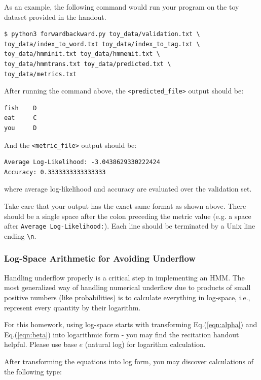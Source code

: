 \documentclass[11pt,addpoints,answers]{exam}
\begin{document}
As an example, the following command would run your program on the toy dataset provided in the handout.
\begin{lstlisting}
$ python3 forwardbackward.py toy_data/validation.txt \ 
toy_data/index_to_word.txt toy_data/index_to_tag.txt \
toy_data/hmminit.txt toy_data/hmmemit.txt \
toy_data/hmmtrans.txt toy_data/predicted.txt \ 
toy_data/metrics.txt
\end{lstlisting}

After running the command above, the \texttt{<predicted\_file>} output should be:

\begin{lstlisting}
fish    D 
eat     C
you     D

\end{lstlisting}

\clearpage
And the \texttt{<metric\_file>} output should be:

\begin{lstlisting}
Average Log-Likelihood: -3.0438629330222424
Accuracy: 0.3333333333333333
\end{lstlisting}

where average log-likelihood and accuracy are evaluated over the validation set.

Take care that your output has the exact same format as shown above. There should be a single space after the colon preceding the metric value (e.g. a space after \lstinline{Average Log-Likelihood:}). Each line should be terminated by a Unix line ending \lstinline{\n}.

\subsubsection{Log-Space Arithmetic for Avoiding Underflow}
\label{sec:underflow}

Handling underflow properly is a critical step in implementing an HMM. The most generalized way of handling numerical underflow due to products of small positive numbers (like probabilities) is to calculate everything in log-space, i.e., represent every quantity by their logarithm. 

For this homework, using log-space starts with transforming Eq.(\ref{eqn:alpha}) and Eq.(\ref{eqn:beta}) into logarithmic form - you may find the recitation handout helpful. Please use base $e$ (natural log) for logarithm calculation.

After transforming the equations into log form, you may discover calculations of the following type:
\end{document}
